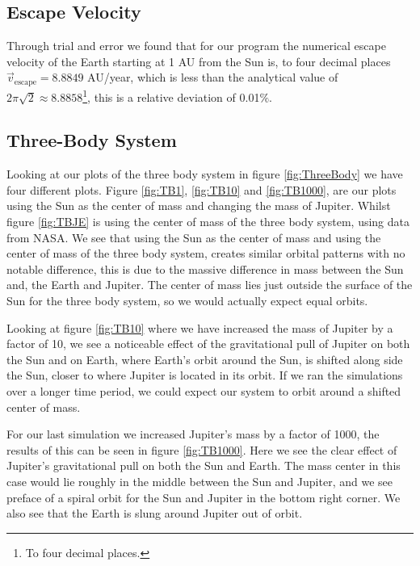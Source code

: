 \documentclass[%
reprint,
nofootinbib,
amsmath,amssymb,
aps,
]{revtex4-1}
\begin{document}
\subsection{Escape Velocity} %
Through trial and error we found that for our program the numerical escape velocity of the Earth starting at 1 AU from the Sun is, to four decimal places $\vec{v}_{\text{escape}} = 8.8849$ AU/year, which is less than the analytical value of $2\pi\sqrt{2} \approx 8.8858$\footnote{To four decimal places.}, this is a relative deviation of 0.01$\%$.
\subsection{Three-Body System}%
Looking at our plots of the three body system in figure \ref{fig:ThreeBody} we have four different plots. Figure \ref{fig:TB1}, \ref{fig:TB10} and \ref{fig:TB1000}, are our plots using the Sun as the center of mass and changing the mass of Jupiter. Whilst figure \ref{fig:TBJE} is using the center of mass of the three body system, using data from NASA. We see that using the Sun as the center of mass and using the center of mass of the three body system, creates similar orbital patterns with no notable difference, this is due to the massive difference in mass between the Sun and, the Earth and Jupiter. The center of mass lies just outside the surface of the Sun for the three body system, so we would actually expect equal orbits. 

Looking at figure \ref{fig:TB10} where we have increased the mass of Jupiter by a factor of 10, we see a noticeable effect of the gravitational pull of Jupiter on both the Sun and on Earth, where Earth's orbit around the Sun, is shifted along side the Sun, closer to where Jupiter is located in its orbit. If we ran the simulations over a longer time period, we could expect our system to orbit around a shifted center of mass. 

For our last simulation we increased Jupiter's mass by a factor of 1000, the results of this can be seen in figure \ref{fig:TB1000}. Here we see the clear effect of Jupiter's gravitational pull on both the Sun and Earth. The mass center in this case would lie roughly in the middle between the Sun and Jupiter, and we see preface of a spiral orbit for the Sun and Jupiter in the bottom right corner. We also see that the Earth is slung around Jupiter out of orbit. 
\end{document}
